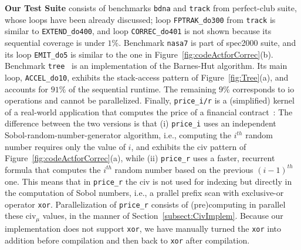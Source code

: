 \documentclass{sig-alternate}
\begin{document}
{\bf Our Test Suite} consists of benchmarks {\tt bdna} and {\tt track} 
from {\sc perfect-club} suite, whose loops have been already discussed;
loop {\tt FPTRAK\_do300} from {\tt track} is similar to {\tt EXTEND\_do400},
and loop {\tt CORREC\_do401} is not shown because 
its sequential coverage is under $1\%$. 
%
Benchmark {\tt nasa7} is part of {\sc spec2000} suite, and its loop {\tt EMIT\_do5}
is similar to the one in Figure~\ref{fig:codeActforCorrec}(b).
%
Benchmark {\tt tree}~\cite{Treecode} is an implementation of the Barnes-Hut algorithm.
Its main loop, {\tt ACCEL\_do10}, exhibits the stack-access pattern of Figure~\ref{fig:Tree}(a),
and accounts for $91\%$ of the sequential runtime. The remaining $9\%$ corresponds to {\sc io}
operations and cannot be parallelized.
%
Finally,  {\tt price\_i/r} is a (simplified) kernel of a real-world application that
computes the price of a financial contract~\cite{LexiFiPricing}:   The difference
between the two versions is that (i) {\tt price\_i} uses an independent Sobol-random-number-generator
algorithm, i.e., computing the $i^{th}$ random number requires only the value of $i$,
and exhibits the {\sc civ} pattern of Figure~\ref{fig:codeActforCorrec}(a), 
while (ii) {\tt price\_r} uses a faster, recurrent formula that computes the 
$i^{th}$ random number based on the previous $(i-1)^{th}$ one. 
This means that in {\tt price\_r} the {\sc civ} is not used for indexing
but directly in the computation of Sobol numbers, i.e., a prallel prefix 
scan with exclusive-or operator {\tt xor}. 
Parallelization of {\tt price\_r} consists of (pre)computing
in parallel these {\sc civ}$_\mu$ values, in the manner of 
Section~\ref{subsect:CivImplem}.  
%
Because our implementation does not support {\tt xor},
we have manually turned the {\tt xor} into addition before 
compilation and then back to {\tt xor} after compilation. 

\end{document}
